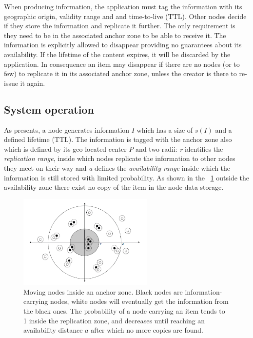 When producing information, the application must tag the information with its
geographic origin, validity range and and time-to-live (TTL).
Other nodes decide if they store the information and replicate it further. The
only requirement is they need to be in the associated anchor zone to be able to
receive it. The information is explicitly allowed to disappear providing no
guarantees about its availability. If the lifetime of the content expires, it
will be discarded by the application. In consequence an item may disappear if
there are no nodes (or to few) to replicate it in its associated anchor zone,
unless the creator is there to re-issue it again.

\subsection{System operation}

As \cite{percomfloatingcontent} presents, a node generates information $I$ which
has a size of $s(I)$ and a defined lifetime (TTL). The information is tagged
with the anchor zone also which is defined by its geo-located center $P$ and two
radii: {\it r} identifies the {\it replication range}, inside which nodes
replicate the information to other nodes they meet on their way and {\it a}
defines the {\it availability range} inside which the information is still
stored with limited probability. As shown in the ~\ref{fig:anchor_zone} outside
the availability zone there exist no copy of the item in the node data storage.

\begin{figure}[bt]
 \centering
 \includegraphics[width=0.6\textwidth]{img/anchor_zone}
 \caption{Moving nodes inside an anchor zone. Black nodes are
 information-carrying nodes, white nodes will eventually get the information
 from the black ones. The probability of a node carrying an item tends to 1
 inside the replication zone, and decreases until reaching an availability
 distance $a$ after which no more copies are found. }
 \label{fig:anchor_zone}
\end{figure}

